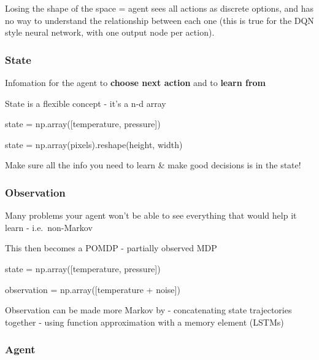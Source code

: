 \documentclass[]{article}
\newenvironment{Shaded}{}{}
\newcommand{\NormalTok}[1]{#1}
\newcommand{\OperatorTok}[1]{\textcolor[rgb]{0.40,0.40,0.40}{#1}}
\begin{document}
Losing the shape of the space = agent sees all actions as discrete
options, and has no way to understand the relationship between each one
(this is true for the DQN style neural network, with one output node per
action).

\hypertarget{state}{%
\subsubsection{State}\label{state}}

Infomation for the agent to \textbf{choose next action} and to
\textbf{learn from}

State is a flexible concept - it's a n-d array

\begin{Shaded}
\begin{Highlighting}[]
\NormalTok{state }\OperatorTok{=}\NormalTok{ np.array([temperature, pressure])}

\NormalTok{state }\OperatorTok{=}\NormalTok{ np.array(pixels).reshape(height, width)}
\end{Highlighting}
\end{Shaded}

Make sure all the info you need to learn \& make good decisions is in
the state!

\hypertarget{observation}{%
\subsubsection{Observation}\label{observation}}

Many problems your agent won't be able to see everything that would help
it learn - i.e.~non-Markov

This then becomes a POMDP - partially observed MDP

\begin{Shaded}
\begin{Highlighting}[]
\NormalTok{state }\OperatorTok{=}\NormalTok{ np.array([temperature, pressure])}

\NormalTok{observation }\OperatorTok{=}\NormalTok{ np.array([temperature }\OperatorTok{+}\NormalTok{ noise])}
\end{Highlighting}
\end{Shaded}

Observation can be made more Markov by - concatenating state
trajectories together - using function approximation with a memory
element (LSTMs)

\hypertarget{agent}{%
\subsubsection{Agent}\label{agent}}
\end{document}
